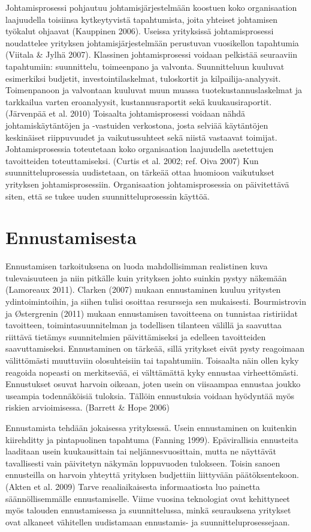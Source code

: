 \documentclass[12pt,a4paper,oneside,pdftex]{report}
\begin{document}
Johtamisprosessi pohjautuu johtamisjärjestelmään koostuen koko organisaation laajuudella toisiinsa kytkeytyvistä tapahtumista, joita yhteiset johtamisen työkalut ohjaavat (Kauppinen 2006). Useissa yrityksissä johtamisprosessi noudattelee yrityksen johtamisjärjestelmään perustuvan vuosikellon tapahtumia (Viitala & Jylhä 2007). Klassinen johtamisprosessi voidaan pelkistää seuraaviin tapahtumiin: suunnittelu, toimeenpano ja valvonta. Suunnitteluun kuuluvat esimerkiksi budjetit, investointilaskelmat, tuloskortit ja kilpailija-analyysit. Toimenpanoon ja valvontaan kuuluvat muun muassa tuotekustannuslaskelmat ja tarkkailua varten eroanalyysit, kustannusraportit sekä kuukausiraportit. (Järvenpää et al. 2010) Toisaalta johtamisprosessi voidaan nähdä johtamiskäytäntöjen ja -vastuiden verkostona, josta selviää käytäntöjen keskinäiset riippuvuudet ja vaikutussuhteet sekä niistä vastaavat toimijat. Johtamisprosessia toteutetaan koko organisaation laajuudella asetettujen tavoitteiden toteuttamiseksi. (Curtis et al. 2002; ref. Oiva 2007) Kun suunnitteluprosessia uudistetaan, on tärkeää ottaa huomioon vaikutukset yrityksen johtamisprosessiin. Organisaation johtamisprosessia on päivitettävä siten, että se tukee uuden suunnitteluprosessin käyttöä.

\section{Ennustamisesta}

Ennustamisen tarkoituksena on luoda mahdollisimman realistinen kuva tulevaisuuteen ja niin pitkälle kuin yrityksen johto suinkin pystyy näkemään (Lamoreaux 2011). Clarken (2007) mukaan ennustaminen kuuluu yritysten ydintoimintoihin, ja siihen tulisi osoittaa resursseja sen mukaisesti. Bourmistrovin ja Østergrenin (2011) mukaan ennustamisen tavoitteena on tunnistaa ristiriidat tavoitteen, toimintasuunnitelman ja todellisen tilanteen välillä ja saavuttaa riittävä tietämys suunnitelmien päivittämiseksi ja edelleen tavoitteiden saavuttamiseksi. Ennustaminen on tärkeää, sillä yritykset eivät pysty reagoimaan välittömästi muuttuviin olosuhteisiin tai tapahtumiin. Toisaalta näin ollen kyky reagoida nopeasti on merkitsevää, ei välttämättä kyky ennustaa virheettömästi. Ennustukset osuvat harvoin oikeaan, joten usein on viisaampaa ennustaa joukko useampia todennäköisiä tuloksia. Tällöin ennustuksia voidaan hyödyntää myös riskien arvioimisessa. (Barrett & Hope 2006)

Ennustamista tehdään jokaisessa yrityksessä. Usein ennustaminen on kuitenkin kiirehditty ja pintapuolinen tapahtuma (Fanning 1999). Epävirallisia ennusteita laaditaan usein kuukausittain tai neljännesvuosittain, mutta ne näyttävät tavallisesti vain päivitetyn näkymän loppuvuoden tulokseen. Toisin sanoen ennusteilla on harvoin yhteyttä yrityksen budjettiin liittyvään päätöksentekoon. (Akten et al. 2009) Tarve reaaliaikaisesta informaatiosta luo painetta säännöllisemmälle ennustamiselle. Viime vuosina teknologiat ovat kehittyneet myös talouden ennustamisessa ja suunnittelussa, minkä seurauksena yritykset ovat alkaneet vähitellen uudistamaan ennustamis- ja suunnitteluprosessejaan.
\end{document}
